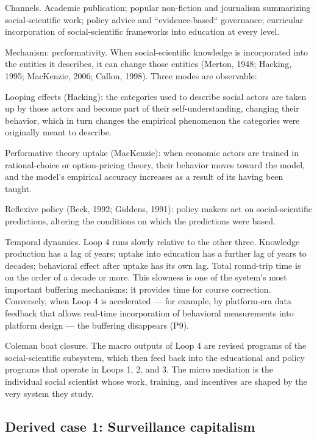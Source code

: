 \documentclass[12pt,a4paper]{article}
\begin{document}
Channels. Academic publication; popular non-fiction and journalism summarizing social-scientific work; policy advice and ``evidence-based`` governance; curricular incorporation of social-scientific frameworks into education at every level.


Mechanism: performativity. When social-scientific knowledge is incorporated into the entities it describes, it can change those entities (Merton, 1948; Hacking, 1995; MacKenzie, 2006; Callon, 1998). Three modes are observable:


Looping effects (Hacking): the categories used to describe social actors are taken up by those actors and become part of their self-understanding, changing their behavior, which in turn changes the empirical phenomenon the categories were originally meant to describe.

Performative theory uptake (MacKenzie): when economic actors are trained in rational-choice or option-pricing theory, their behavior moves toward the model, and the model's empirical accuracy increases as a result of its having been taught.

Reflexive policy (Beck, 1992; Giddens, 1991): policy makers act on social-scientific predictions, altering the conditions on which the predictions were based.


Temporal dynamics. Loop 4 runs slowly relative to the other three. Knowledge production has a lag of years; uptake into education has a further lag of years to decades; behavioral effect after uptake has its own lag. Total round-trip time is on the order of a decade or more. This slowness is one of the system's most important buffering mechanisms: it provides time for course correction. Conversely, when Loop 4 is accelerated --- for example, by platform-era data feedback that allows real-time incorporation of behavioral measurements into platform design --- the buffering disappears (P9).


Coleman boat closure. The macro outputs of Loop 4 are revised programs of the social-scientific subsystem, which then feed back into the educational and policy programs that operate in Loops 1, 2, and 3. The micro mediation is the individual social scientist whose work, training, and incentives are shaped by the very system they study.

\subsection{Derived case 1: Surveillance capitalism}
\end{document}
